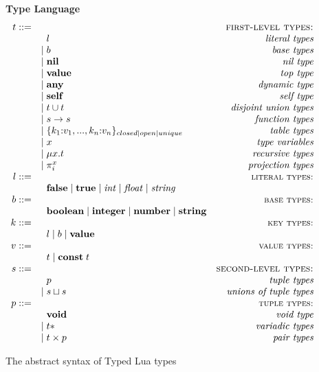\begin{figure}[!ht]
\textbf{Type Language}\\
\dstart
$$
\begin{array}{rlr}
t ::= & & \textsc{first-level types:}\\
& \;\; l & \textit{literal types}\\
& | \; b & \textit{base types}\\
& | \; \mathbf{nil} & \textit{nil type}\\
& | \; \mathbf{value} & \textit{top type}\\
& | \; \mathbf{any} & \textit{dynamic type}\\
& | \; \mathbf{self} & \textit{self type}\\
& | \; t \cup t & \textit{disjoint union types}\\
& | \; s \rightarrow s & \textit{function types}\\
& | \; \{k_{1}{:}v_{1}, ..., k_{n}{:}v_{n}\}_{closed|open|unique} & \textit{table types}\\
& | \; x & \textit{type variables}\\
& | \; \mu x.t & \textit{recursive types}\\
& | \; \pi_{i}^{x} & \textit{projection types}\\
l ::= & & \textsc{{\small literal types:}}\\
& \;\; \mathbf{false} \; | \; \mathbf{true} \; | \; {\it int} \; | \; {\it float} \; | \; {\it string} &\\
b ::= & & \textsc{{\small base types:}}\\
& \;\; \mathbf{boolean} \; | \; \mathbf{integer} \; | \; \mathbf{number} \; | \; \mathbf{string} &\\
k ::= & & \textsc{{\small key types:}}\\
& \;\; l \; | \; b \; | \; \mathbf{value} &\\
v ::= & & \textsc{{\small value types:}}\\
& \;\; t \; | \; \mathbf{const} \; t &\\ 
s ::= & & \textsc{second-level types:}\\
& \;\; p & \textit{tuple types}\\
& | \; s \sqcup s & \textit{unions of tuple types}\\
p ::= & & \textsc{{\small tuple types:}}\\
& \;\; \mathbf{void} & \textit{void type}\\
& | \; t* & \textit{variadic types}\\
& | \; t \times p & \textit{pair types}
\end{array}
$$
\dend
\caption{The abstract syntax of Typed Lua types}
\label{fig:typelang}
\end{figure}


